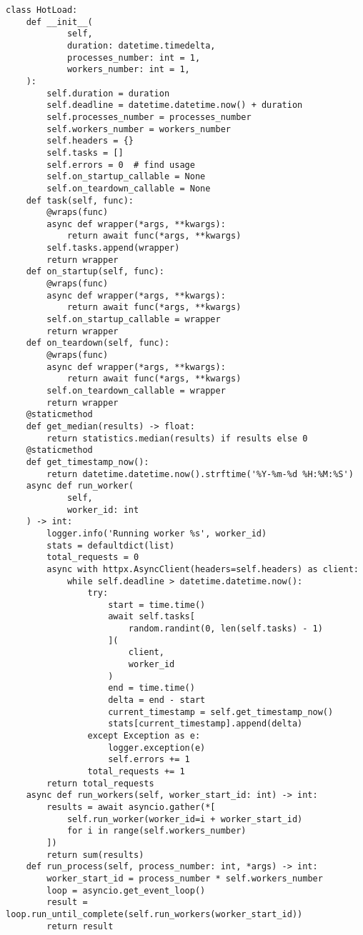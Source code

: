 \begin{lstlisting}
class HotLoad:
    def __init__(
            self,
            duration: datetime.timedelta,
            processes_number: int = 1,
            workers_number: int = 1,
    ):
        self.duration = duration
        self.deadline = datetime.datetime.now() + duration
        self.processes_number = processes_number
        self.workers_number = workers_number
        self.headers = {}
        self.tasks = []
        self.errors = 0  # find usage
        self.on_startup_callable = None
        self.on_teardown_callable = None
    def task(self, func):
        @wraps(func)
        async def wrapper(*args, **kwargs):
            return await func(*args, **kwargs)
        self.tasks.append(wrapper)
        return wrapper
    def on_startup(self, func):
        @wraps(func)
        async def wrapper(*args, **kwargs):
            return await func(*args, **kwargs)
        self.on_startup_callable = wrapper
        return wrapper
    def on_teardown(self, func):
        @wraps(func)
        async def wrapper(*args, **kwargs):
            return await func(*args, **kwargs)
        self.on_teardown_callable = wrapper
        return wrapper
    @staticmethod
    def get_median(results) -> float:
        return statistics.median(results) if results else 0
    @staticmethod
    def get_timestamp_now():
        return datetime.datetime.now().strftime('%Y-%m-%d %H:%M:%S')
    async def run_worker(
            self,
            worker_id: int
    ) -> int:
        logger.info('Running worker %s', worker_id)
        stats = defaultdict(list)
        total_requests = 0
        async with httpx.AsyncClient(headers=self.headers) as client:
            while self.deadline > datetime.datetime.now():
                try:
                    start = time.time()
                    await self.tasks[
                        random.randint(0, len(self.tasks) - 1)
                    ](
                        client,
                        worker_id
                    )
                    end = time.time()
                    delta = end - start
                    current_timestamp = self.get_timestamp_now()
                    stats[current_timestamp].append(delta)
                except Exception as e:
                    logger.exception(e)
                    self.errors += 1
                total_requests += 1
        return total_requests
    async def run_workers(self, worker_start_id: int) -> int:
        results = await asyncio.gather(*[
            self.run_worker(worker_id=i + worker_start_id)
            for i in range(self.workers_number)
        ])
        return sum(results)
    def run_process(self, process_number: int, *args) -> int:
        worker_start_id = process_number * self.workers_number
        loop = asyncio.get_event_loop()
        result = loop.run_until_complete(self.run_workers(worker_start_id))
        return result



\end{lstlisting}
